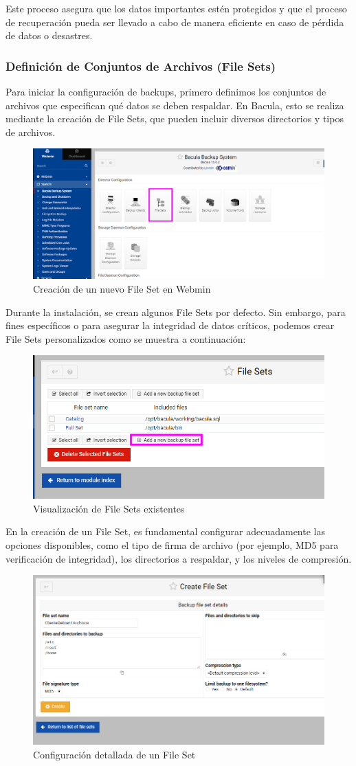 Este proceso asegura que los datos importantes estén protegidos y que el proceso de recuperación pueda ser llevado a cabo de manera eficiente en caso de pérdida de datos o desastres.


\subsubsection{Definición de Conjuntos de Archivos (File Sets)}
Para iniciar la configuración de backups, primero definimos los conjuntos de archivos que especifican qué datos se deben respaldar. En Bacula, esto se realiza mediante la creación de File Sets, que pueden incluir diversos directorios y tipos de archivos.

\begin{figure}[H]
    \centering
    \includegraphics[width=0.5\linewidth]{instalacionBacula/filesetwebmin.png}
    \caption{Creación de un nuevo File Set en Webmin}
\end{figure}

Durante la instalación, se crean algunos File Sets por defecto. Sin embargo, para fines específicos o para asegurar la integridad de datos críticos, podemos crear File Sets personalizados como se muestra a continuación:

\begin{figure}[H]
    \centering
    \includegraphics[width=0.5\linewidth]{instalacionBacula/cpropiofileset.png}
    \caption{Visualización de File Sets existentes}
\end{figure}

En la creación de un File Set, es fundamental configurar adecuadamente las opciones disponibles, como el tipo de firma de archivo (por ejemplo, MD5 para verificación de integridad), los directorios a respaldar, y los niveles de compresión.

\begin{figure}[H]
    \centering
    \includegraphics[width=0.5\linewidth]{instalacionBacula/createrfilesett.png}
    \caption{Configuración detallada de un File Set}
\end{figure}

